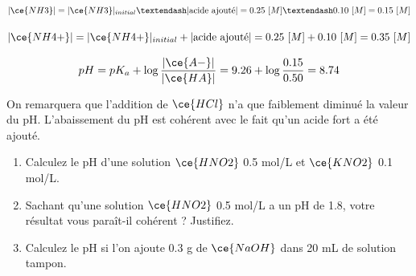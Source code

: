 \documentclass[
  11pt,
  a4paper,
  openany]{book}
\providecommand{\tightlist}{%
  \setlength{\itemsep}{0pt}\setlength{\parskip}{0pt}}
\begin{document}
\[
|\ce{NH3}| = |\ce{NH3}|_{initial} – |\text{acide ajouté}| = 0.25\ [M] – 0.10\ [M] = 0.15\ [M]
\]

\[
|\ce{NH4+}| = |\ce{NH4+}|_{initial} + |\text{acide ajouté}| = 0.25\ [M] + 0.10\ [M] = 0.35\ [M]
\]

\[
pH = pK_a + \log \frac{|\ce{A-}|}{|\ce{HA}|} = 9.26 + \log \frac{0.15}{0.50} = 8.74
\]

On remarquera que l'addition de \(\ce{HCl}\) n'a que faiblement diminué la valeur du pH. L'abaissement du pH est cohérent avec le fait qu'un acide fort a été ajouté.

\clearpage

\begin{Exercise}

\begin{enumerate}
\def\labelenumi{\alph{enumi}.}
\tightlist
\item
  Calculez le pH d'une solution \(\ce{HNO2}\) 0.5 mol/L et \(\ce{KNO2}\) 0.1 mol/L.
\item
  Sachant qu'une solution \(\ce{HNO2}\) 0.5 mol/L a un pH de 1.8, votre résultat vous paraît-il cohérent ? Justifiez.
\item
  Calculez le pH si l'on ajoute 0.3 g de \(\ce{NaOH}\) dans 20 mL de solution tampon.
\end{enumerate}

\end{Exercise}
\end{document}
